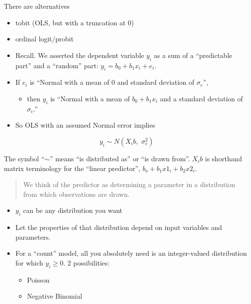 \documentclass[10pt,english]{beamer}
\def\lyxframeend{} %
\begin{document}
\lyxframeend{}

There are alternatives
\begin{itemize}
\item tobit (OLS, but with a truncation at 0)
\item ordinal logit/probit
\end{itemize}

\lyxframeend{}
\begin{itemize}
\item Recall. We asserted the dependent variable $y_{i}$ as a sum of a
``predictable part'' and a ``random'' part: $y_{i}=b_{0}+b_{1}x_{i}+e_{i}$.
\item If $e_{i}$ is ``Normal with a mean of 0 and standard deviation of
$\sigma_{e}$'', 

\begin{itemize}
\item then $y_{i}$ is ``Normal with a mean of $b_{0}+b_{1}x_{i}$ and
a standard deviation of $\sigma_{e}$.'' 
\end{itemize}
\item So OLS with an assumed Normal error implies
\end{itemize}
\[
y_{i}\sim N(X_{i}b,\,\,\sigma_{e}^{2})
\]


The symbol ``$\sim$'' means ``is distributed as'' or ``is drawn
from''. $X_{i}b$ is shorthand matrix terminology for the ``linear
predictor'', $b_{o}+b_{1}x1_{i}+b_{2}x2_{i}$. 


\lyxframeend{}
\begin{quote}%
We think of the predictor as determining a parameter in a distribution
from which observations are drawn. 
\end{quote}%

\lyxframeend{}
\begin{itemize}
\item $y_{i}$ can be any distribution you want
\item Let the properties of that distribution depend on input variables
and parameters. 
\item For a ``count'' model, all you absolutely need is an integer-valued
distribution for which $y_{i}\geq0$. 2 possibilities:

\begin{itemize}
\item Poisson 
\item Negative Binomial
\end{itemize}
\end{itemize}
\end{document}
